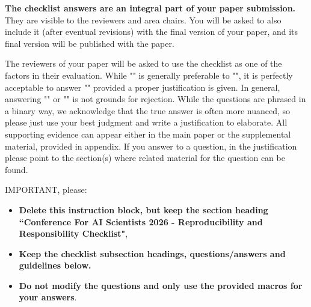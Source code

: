 \documentclass{article}
\begin{document}
{\bf The checklist answers are an integral part of your paper submission.} They are visible to the reviewers and area chairs. You will be asked to also include it (after eventual revisions) with the final version of your paper, and its final version will be published with the paper.

The reviewers of your paper will be asked to use the checklist as one of the factors in their evaluation. While "\answerYes{}" is generally preferable to "\answerNo{}", it is perfectly acceptable to answer "\answerNo{}" provided a proper justification is given. In general, answering "\answerNo{}" or "\answerNA{}" is not grounds for rejection. While the questions are phrased in a binary way, we acknowledge that the true answer is often more nuanced, so please just use your best judgment and write a justification to elaborate. All supporting evidence can appear either in the main paper or the supplemental material, provided in appendix. If you answer \answerYes{} to a question, in the justification please point to the section(s) where related material for the question can be found.

IMPORTANT, please:
\begin{itemize}
    \item {\bf Delete this instruction block, but keep the section heading ``Conference For AI Scientists 2026 - Reproducibility and Responsibility Checklist"},
    \item  {\bf Keep the checklist subsection headings, questions/answers and guidelines below.}
    \item {\bf Do not modify the questions and only use the provided macros for your answers}.
\end{itemize} 
\end{document}
